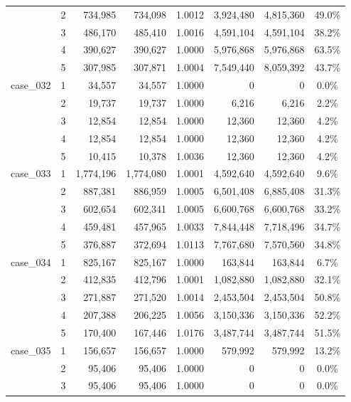 \begin{footnotesize}
\begin{longtable}{l c rr c rr c}
 & 2 & 734{,}985 & 734{,}098 & 1.0012 & 3{,}924{,}480 & 4{,}815{,}360 & 49.0\% \\
 & 3 & 486{,}170 & 485{,}410 & 1.0016 & 4{,}591{,}104 & 4{,}591{,}104 & 38.2\% \\
 & 4 & 390{,}627 & 390{,}627 & 1.0000 & 5{,}976{,}868 & 5{,}976{,}868 & 63.5\% \\
 & 5 & 307{,}985 & 307{,}871 & 1.0004 & 7{,}549{,}440 & 8{,}059{,}392 & 43.7\% \\
\addlinespace[2pt]
case\_032 & 1 & 34{,}557 & 34{,}557 & 1.0000 & 0 & 0 & 0.0\% \\
 & 2 & 19{,}737 & 19{,}737 & 1.0000 & 6{,}216 & 6{,}216 & 2.2\% \\
 & 3 & 12{,}854 & 12{,}854 & 1.0000 & 12{,}360 & 12{,}360 & 4.2\% \\
 & 4 & 12{,}854 & 12{,}854 & 1.0000 & 12{,}360 & 12{,}360 & 4.2\% \\
 & 5 & 10{,}415 & 10{,}378 & 1.0036 & 12{,}360 & 12{,}360 & 4.2\% \\
\addlinespace[2pt]
case\_033 & 1 & 1{,}774{,}196 & 1{,}774{,}080 & 1.0001 & 4{,}592{,}640 & 4{,}592{,}640 & 9.6\% \\
 & 2 & 887{,}381 & 886{,}959 & 1.0005 & 6{,}501{,}408 & 6{,}885{,}408 & 31.3\% \\
 & 3 & 602{,}654 & 602{,}341 & 1.0005 & 6{,}600{,}768 & 6{,}600{,}768 & 33.2\% \\
 & 4 & 459{,}481 & 457{,}965 & 1.0033 & 7{,}844{,}448 & 7{,}718{,}496 & 34.7\% \\
 & 5 & 376{,}887 & 372{,}694 & 1.0113 & 7{,}767{,}680 & 7{,}570{,}560 & 34.8\% \\
\addlinespace[2pt]
case\_034 & 1 & 825{,}167 & 825{,}167 & 1.0000 & 163{,}844 & 163{,}844 & 6.7\% \\
 & 2 & 412{,}835 & 412{,}796 & 1.0001 & 1{,}082{,}880 & 1{,}082{,}880 & 32.1\% \\
 & 3 & 271{,}887 & 271{,}520 & 1.0014 & 2{,}453{,}504 & 2{,}453{,}504 & 50.8\% \\
 & 4 & 207{,}388 & 206{,}225 & 1.0056 & 3{,}150{,}336 & 3{,}150{,}336 & 52.2\% \\
 & 5 & 170{,}400 & 167{,}446 & 1.0176 & 3{,}487{,}744 & 3{,}487{,}744 & 51.5\% \\
\addlinespace[2pt]
case\_035 & 1 & 156{,}657 & 156{,}657 & 1.0000 & 579{,}992 & 579{,}992 & 13.2\% \\
 & 2 & 95{,}406 & 95{,}406 & 1.0000 & 0 & 0 & 0.0\% \\
 & 3 & 95{,}406 & 95{,}406 & 1.0000 & 0 & 0 & 0.0\% \\

\end{longtable}
\end{footnotesize}
